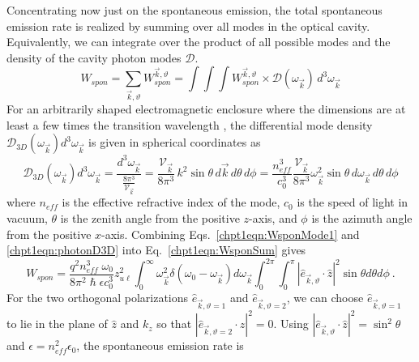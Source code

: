 \documentclass[12pt]{report}
\begin{document}
{Concentrating now just on the spontaneous emission, the total spontaneous emission rate is realized by summing over all modes in the optical cavity.  Equivalently, we can integrate over the product of all possible modes and the density of the cavity photon modes $\mathscr{D}$.
\begin{equation}
\label{chpt1eqn:WsponSum}
W_{spon}=\sum_{\vec{k},\vartheta} W_{spon}^{\vec{k},\vartheta} = \int \! \int \!\int W_{spon}^{\vec{k},\vartheta} \times \mathscr{D}(\omega_{\vec{k}}) \, d^3 \omega_{\vec{k}}
\end{equation}
For an arbitrarily shaped electromagnetic enclosure where the dimensions are at least a few times the transition wavelength \cite{Smet:JAP:1996}, the differential mode density $\mathscr{D}_{3D}(\omega_{\vec{k}}) d^3\omega_{\vec{k}}$ is given in spherical coordinates as \cite{SalehTeich:book:1991}%
\begin{equation}
\label{chpt1eqn:photonD3D}
\mathscr{D}_{3D}(\omega_{\vec{k}}) d^3\omega_{\vec{k}} = \frac{d^3\omega_{\vec{k}}}{\frac{8 \pi^3}{\mathcal{V}_{\vec{k}}}} = \frac{\mathcal{V}_{\vec{k}}}{8 \pi^3} \, k^2 \sin \theta \, d\vec{k} \, d\theta \, d\phi = \frac{n_{eff}^3}{c_0^3} \frac{\mathcal{V}_{\vec{k}}}{8 \pi^3} \omega_{\vec{k}}^2 \sin\theta \, d\omega_{\vec{k}} \, d\theta \, d\phi
\end{equation}
where $n_{eff}$ is the effective refractive index of the mode, $c_0$ is the speed of light in vacuum, $\theta$ is the zenith angle from the positive $z$-axis, and $\phi$ is the azimuth angle from the positive $x$-axis. Combining Eqs.~\eqref{chpt1eqn:WsponMode1} and \eqref{chpt1eqn:photonD3D} into Eq.~\eqref{chpt1eqn:WsponSum} gives
\begin{equation}
W_{spon}=\frac{q^2 n_{eff}^3 \;\omega_0}{8 \pi^2 \hslash \epsilon c_0^3} z_{u\ell}^2 \int_0^\infty \omega_{\vec{k}}^2 \delta(\omega_0 - \omega_{\vec{k}}) d\omega_{\vec{k}} \int_0^{2\pi}\!\int_0^{\pi}|\hat{e}_{\vec{k},\vartheta} \cdot \hat{z}|^2 \sin \theta d\theta d\phi {~.}
\end{equation}
For the two orthogonal polarizations $\hat{e}_{\vec{k},\vartheta=1}$ and $\hat{e}_{\vec{k},\vartheta=2}$, we can choose $\hat{e}_{\vec{k},\vartheta=1}$ to lie in the plane of $\hat{z}$ and $k_z$ so that $|\hat{e}_{\vec{k},\vartheta=2}\cdot \hat{z}|^2=0$.  Using $|\hat{e}_{\vec{k},\vartheta} \cdot \hat{z}|^2=\sin^2\theta$ and $\epsilon=n_{eff}^2 \epsilon_0$, the spontaneous emission rate is \cite{Yariv:book:1989} \cite{Parker:book:2005} \cite{Smet:JAP:1996}  \cite{Rosencher:book:2002}
}
\end{document}
